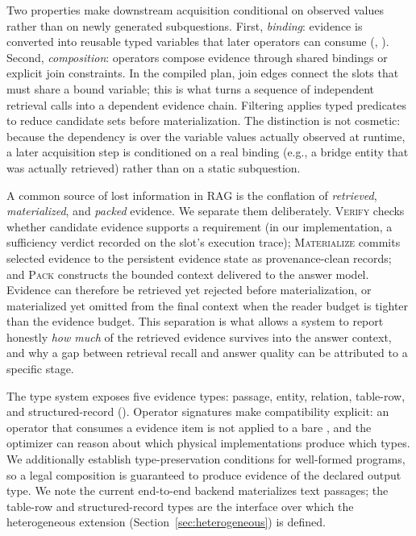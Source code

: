 Two properties make downstream acquisition conditional on observed values
rather than on newly generated subquestions. First, \emph{binding}: evidence is
converted into reusable typed variables that later operators can consume
(, ). Second, \emph{composition}:
operators compose evidence through shared bindings or explicit join
constraints. In the compiled plan, join edges connect the slots that must share
a bound variable; this is what turns a sequence of independent retrieval calls
into a dependent evidence chain. Filtering applies typed predicates to reduce
candidate sets before materialization. The distinction is not cosmetic: because
the dependency is over the variable values actually observed at runtime, a
later acquisition step is conditioned on a real binding (e.g., a bridge entity
that was actually retrieved) rather than on a static subquestion.

A common source of lost information in RAG is the conflation of
\emph{retrieved}, \emph{materialized}, and \emph{packed} evidence. We separate
them deliberately. \textsc{Verify} checks whether candidate evidence supports a
requirement (in our implementation, a sufficiency verdict recorded on the
slot's execution trace); \textsc{Materialize} commits selected evidence to the
persistent evidence state as provenance-clean records; and \textsc{Pack}
constructs the bounded context delivered to the answer model. Evidence can
therefore be retrieved yet rejected before materialization, or materialized yet
omitted from the final context when the reader budget is tighter than the
evidence budget. This separation is what allows a system to report honestly
\emph{how much} of the retrieved evidence survives into the answer context, and
why a gap between retrieval recall and answer quality can be attributed to a
specific stage.

The type system exposes five evidence types: passage, entity, relation,
table-row, and structured-record (). Operator signatures
make compatibility explicit: an operator that consumes a 
evidence item is not applied to a bare , and the optimizer can
reason about which physical implementations produce which types. We
additionally establish type-preservation conditions for well-formed programs,
so a legal composition is guaranteed to produce evidence of the declared output
type. We note the current end-to-end backend materializes text passages; the
table-row and structured-record types are the interface over which the
heterogeneous extension (Section~\ref{sec:heterogeneous}) is defined.

